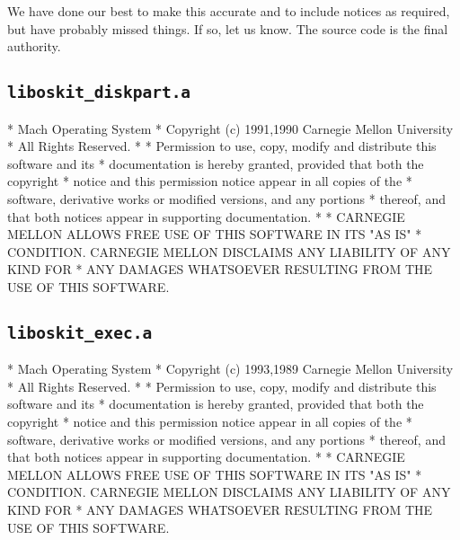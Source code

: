 We have done our best to make this accurate and to include notices as
required, but have probably missed things.  If so, let us know.  The
source code is the final authority.

\subsection{\texttt{liboskit_diskpart.a}}
\begin{copyrightEnv}
 * Mach Operating System
 * Copyright (c) 1991,1990 Carnegie Mellon University
 * All Rights Reserved.
 *
 * Permission to use, copy, modify and distribute this software and its
 * documentation is hereby granted, provided that both the copyright
 * notice and this permission notice appear in all copies of the
 * software, derivative works or modified versions, and any portions
 * thereof, and that both notices appear in supporting documentation.
 *
 * CARNEGIE MELLON ALLOWS FREE USE OF THIS SOFTWARE IN ITS "AS IS"
 * CONDITION.  CARNEGIE MELLON DISCLAIMS ANY LIABILITY OF ANY KIND FOR
 * ANY DAMAGES WHATSOEVER RESULTING FROM THE USE OF THIS SOFTWARE.
\end{copyrightEnv}


\subsection{\texttt{liboskit_exec.a}}
\begin{copyrightEnv}
 * Mach Operating System
 * Copyright (c) 1993,1989 Carnegie Mellon University
 * All Rights Reserved.
 *
 * Permission to use, copy, modify and distribute this software and its
 * documentation is hereby granted, provided that both the copyright
 * notice and this permission notice appear in all copies of the
 * software, derivative works or modified versions, and any portions
 * thereof, and that both notices appear in supporting documentation.
 *
 * CARNEGIE MELLON ALLOWS FREE USE OF THIS SOFTWARE IN ITS "AS IS"
 * CONDITION.  CARNEGIE MELLON DISCLAIMS ANY LIABILITY OF ANY KIND FOR
 * ANY DAMAGES WHATSOEVER RESULTING FROM THE USE OF THIS SOFTWARE.
\end{copyrightEnv}

